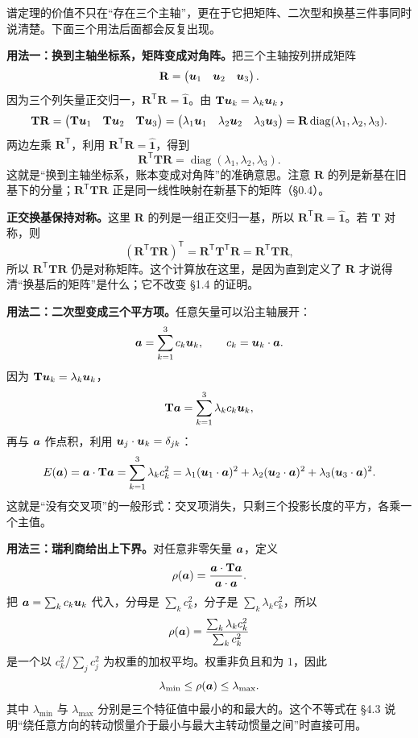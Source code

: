 \documentclass[11pt]{ctexart}
\newcommand{\ten}[1]{\mathbf{#1}}
\newcommand{\unitd}{\hat{\ten{1}}}
\begin{document}
谱定理的价值不只在“存在三个主轴”，更在于它把矩阵、二次型和换基三件事同时说清楚。下面三个用法后面都会反复出现。

\textbf{用法一：换到主轴坐标系，矩阵变成对角阵。}把三个主轴按列拼成矩阵
\[
\ten R=\begin{pmatrix}\vect u_1&\vect u_2&\vect u_3\end{pmatrix}.
\]
因为三个列矢量正交归一，$\ten R^{\mathsf T}\ten R=\unitd$。由 $\ten T\vect u_k=\lambda_k\vect u_k$，
\[
\ten T\ten R
=\begin{pmatrix}\ten T\vect u_1&\ten T\vect u_2&\ten T\vect u_3\end{pmatrix}
=\begin{pmatrix}\lambda_1\vect u_1&\lambda_2\vect u_2&\lambda_3\vect u_3\end{pmatrix}
=\ten R\operatorname{diag}(\lambda_1,\lambda_2,\lambda_3).
\]
两边左乘 $\ten R^{\mathsf T}$，利用 $\ten R^{\mathsf T}\ten R=\unitd$，得到
\[
\ten R^{\mathsf T}\ten T\ten R
=\operatorname{diag}(\lambda_1,\lambda_2,\lambda_3).
\]
这就是“换到主轴坐标系，账本变成对角阵”的准确意思。注意 $\ten R$ 的列是新基在旧基下的分量；$\ten R^{\mathsf T}\ten T\ten R$ 正是同一线性映射在新基下的矩阵（\S0.4）。

\textbf{正交换基保持对称。}这里 $\ten R$ 的列是一组正交归一基，所以 $\ten R^{\mathsf T}\ten R=\unitd$。若 $\ten T$ 对称，则
\[
(\ten R^{\mathsf T}\ten T\ten R)^{\mathsf T}
=\ten R^{\mathsf T}\ten T^{\mathsf T}\ten R
=\ten R^{\mathsf T}\ten T\ten R,
\]
所以 $\ten R^{\mathsf T}\ten T\ten R$ 仍是对称矩阵。这个计算放在这里，是因为直到定义了 $\ten R$ 才说得清“换基后的矩阵”是什么；它不改变 \S1.4 的证明。

\textbf{用法二：二次型变成三个平方项。}任意矢量可以沿主轴展开：
\[
\boldsymbol{a}=\sum_{k=1}^{3}c_k\boldsymbol{u}_k,
\qquad
c_k=\boldsymbol{u}_k\cdot\boldsymbol{a} .
\]
因为 $\ten T\vect u_k=\lambda_k\vect u_k$，
\[
\ten T\vect a=\sum_{k=1}^{3}\lambda_k c_k\vect u_k,
\]
再与 $\boldsymbol{a}$ 作点积，利用 $\boldsymbol{u}_j\cdot\boldsymbol{u}_k=\delta_{jk}$：
\[
E(\vect a)=\vect a\cdot\ten T\vect a
=\sum_{k=1}^{3}\lambda_k c_k^2
=\lambda_1(\vect u_1\cdot\vect a)^2
+\lambda_2(\vect u_2\cdot\vect a)^2
+\lambda_3(\vect u_3\cdot\vect a)^2 .
\]
这就是“没有交叉项”的一般形式：交叉项消失，只剩三个投影长度的平方，各乘一个主值。

\textbf{用法三：瑞利商给出上下界。}对任意非零矢量 $\boldsymbol{a}$，定义
\[
\rho(\vect a)=\frac{\vect a\cdot\ten T\vect a}{\vect a\cdot\vect a}.
\]
把 $\boldsymbol{a}=\sum_k c_k\boldsymbol{u}_k$ 代入，分母是 $\sum_k c_k^2$，分子是 $\sum_k\lambda_k c_k^2$，所以
\[
\rho(\boldsymbol{a})
=\frac{\sum_k\lambda_k c_k^2}{\sum_k c_k^2}
\]
是一个以 $c_k^2/\sum_j c_j^2$ 为权重的加权平均。权重非负且和为 $1$，因此
\[
\lambda_{\min}\le\rho(\boldsymbol{a})\le\lambda_{\max}.
\]
其中 $\lambda_{\min}$ 与 $\lambda_{\max}$ 分别是三个特征值中最小的和最大的。这个不等式在 \S4.3 说明“绕任意方向的转动惯量介于最小与最大主转动惯量之间”时直接可用。
\end{document}
